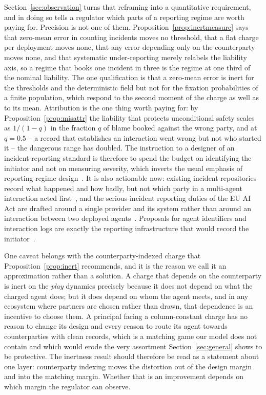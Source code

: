 \documentclass[pdflatex]{sn-jnl}
\theoremstyle{thmstyleone}
\theoremstyle{thmstylethree}
\theoremstyle{thmstyletwo}
\begin{document}
Section~\ref{sec:observation} turns that reframing into a quantitative
requirement, and in doing so tells a regulator which parts of a reporting
regime are worth paying for. Precision is not one of them.
Proposition~\ref{prop:inertmeasure} says that zero-mean error in counting
incidents moves no threshold, that a flat charge per deployment moves none,
that any error depending only on the counterparty moves none, and that
systematic under-reporting merely relabels the liability axis, so a regime
that books one incident in three is the regime at one third of the nominal
liability. The one qualification is that a zero-mean error is inert for the
thresholds and the deterministic field but not for the fixation probabilities
of a finite population, which respond to the second moment of the charge as
well as to its mean. Attribution is the one thing worth paying
for: by Proposition~\ref{prop:misattr} the liability that protects
unconditional safety scales as $1/(1-q)$ in the fraction $q$ of blame booked
against the wrong party, and at $q=0.5$ -- a record that establishes an
interaction went wrong but not who started it -- the dangerous range has
doubled. The instruction to a designer of an incident-reporting standard is
therefore to spend the budget on identifying the initiator and not on
measuring severity, which inverts the usual emphasis of reporting-regime
design~\citep{dixon2024hybrid}. It is also actionable
now: existing incident repositories record what happened and how badly, but
not which party in a multi-agent interaction acted
first~\citep{mcgregor2021incident}, and the serious-incident reporting duties
of the EU AI Act are drafted around a single provider and its system rather
than around an interaction between two deployed
agents~\citep{euaiact2024,buiten2023liability}. Proposals for agent
identifiers and interaction logs are exactly the reporting infrastructure that
would record the
initiator~\citep{shavit2023practices,chan2024visibility,chan2024ids}.

One caveat belongs with the counterparty-indexed charge that
Proposition~\ref{prop:inert} recommends, and it is the reason we call it an
approximation rather than a solution. A charge that depends on the counterparty
is inert on the \emph{play} dynamics precisely because it does not depend on
what the charged agent does; but it does depend on whom the agent meets, and
in any ecosystem where partners are chosen rather than drawn, that dependence
is an incentive to choose them. A principal facing a column-constant charge
has no reason to change its design and every reason to route its agent towards
counterparties with clean records, which is a matching game our model does not
contain and which would erode the very assortment
Section~\ref{sec:general} shows to be protective. The inertness result should
therefore be read as a statement about one layer: counterparty indexing moves
the distortion out of the design margin and into the matching margin. Whether
that is an improvement depends on which margin the regulator can observe.
\end{document}
